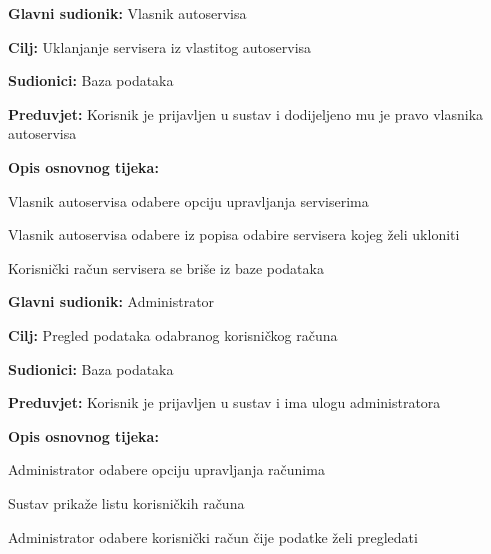 \noindent {}
\begin{packed_item}
	
	\item \textbf{Glavni sudionik: } Vlasnik autoservisa
	\item  \textbf{Cilj:} Uklanjanje servisera iz vlastitog autoservisa
	\item  \textbf{Sudionici:} Baza podataka
	\item  \textbf{Preduvjet:} Korisnik je prijavljen u sustav i dodijeljeno
	mu je pravo vlasnika autoservisa
	\item  \textbf{Opis osnovnog tijeka:}
	
	\item[] \begin{packed_enum}
		
		\item Vlasnik autoservisa odabere opciju upravljanja serviserima
		\item Vlasnik autoservisa odabere iz popisa odabire servisera kojeg želi
		ukloniti
		\item Korisnički račun servisera se briše iz baze podataka
		
	\end{packed_enum}
\end{packed_item}


\noindent {}
\begin{packed_item}
	
	\item \textbf{Glavni sudionik: } Administrator
	\item  \textbf{Cilj:} Pregled podataka odabranog
	korisničkog računa
	\item  \textbf{Sudionici:} Baza podataka
	\item  \textbf{Preduvjet:} Korisnik je prijavljen u sustav i ima ulogu administratora
	\item  \textbf{Opis osnovnog tijeka:}
	
	\item[] \begin{packed_enum}
		
		\item Administrator odabere opciju upravljanja
		računima
		\item Sustav prikaže listu korisničkih računa
		\item Administrator odabere korisnički račun čije podatke želi pregledati
		
	\end{packed_enum}
\end{packed_item}

